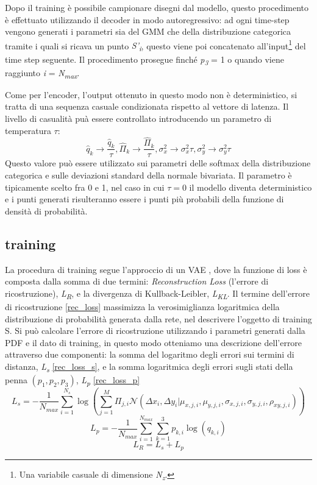 Dopo il training è possibile campionare disegni dal modello, questo procedimento è effettuato utilizzando il decoder in modo autoregressivo: ad ogni time-step vengono generati i parametri sia del GMM che della distribuzione categorica tramite i quali si ricava un punto \textit{S'\textsubscript{i}}, questo viene poi concatenato all'input\footnote{Una variabile casuale di dimensione \textit{N\textsubscript{z}}.} del time step seguente. Il procedimento prosegue finché \textit{p\textsubscript{3}} = 1 o quando viene raggiunto \textit{i} = \textit{N\textsubscript{max}}.

Come per l'encoder, l'output ottenuto in questo modo non è deterministico, si tratta di una sequenza casuale condizionata rispetto al vettore di latenza. Il livello di casualità puà essere controllato introducendo un parametro di temperatura $\tau$:
\begin{equation}
	\label{temperature}
	\hat q_k \rightarrow \frac{\hat q_k}{\tau}, \hat \Pi_k \rightarrow \frac{\hat \Pi_k}{\tau}, \sigma_x^2 \rightarrow \sigma_x^2 \tau, \sigma_y^2 \rightarrow \sigma_y^2 \tau
\end{equation}
Questo valore può essere utilizzato sui parametri delle softmax della distribuzione categorica e sulle deviazioni standard della normale bivariata. Il parametro è tipicamente scelto fra 0 e 1, nel caso in cui $\tau = 0$ il modello diventa deterministico e i punti generati risulteranno essere i punti più probabili della funzione di densità di probabilità.
\subsection{training} %
\label{sub:training}
La procedura di training segue l'approccio di un VAE \cite{VAE}, dove la funzione di loss è composta dalla somma di due termini: \textit{Reconstruction Loss} (l'errore di ricostruzione), \textit{L\textsubscript{R}}, e la divergenza di Kullback-Leibler, \textit{L\textsubscript{KL}}. Il termine dell'errore di ricostruzione \ref{rec_loss} massimizza la verosimiglianza logaritmica della distribuzione di probabilità generata dalla rete, nel descrivere l'oggetto di training S. Si può calcolare l'errore di ricostruzione utilizzando i parametri generati dalla PDF e il dato di training, in questo modo otteniamo una descrizione dell'errore attraverso due componenti: la somma del logaritmo degli errori sui termini di distanza, \textit{L\textsubscript{s}} \ref{rec_loss_s}, e la somma logaritmica degli errori sugli stati della penna $(p_1, p_2, p_3)$, \textit{L\textsubscript{p}} \ref{rec_loss_p}
\begin{equation}
	\label{rec_loss_s}
	L_s = - \frac{1}{N_{max}}\sum_{i=1}^{N_s}\log(\sum_{j=1}^M \Pi_{j,i} \mathcal{N}(\Delta x_i, \Delta y_i | \mu_{x,j, i}, \mu_{y,j, i}, \sigma_{x,j, i}, \sigma_{y,j, i}, \rho_{xy, j, i}))
\end{equation}
\begin{equation}
	\label{rec_loss_p}
	L_p = - \frac{1}{N_{max}}\sum_{i=1}^{N_{max}}\sum_{k=1}^{3} p_{k, i}\log(q_{k, i})
\end{equation}
\begin{equation}
	\label{rec_loss}
	L_R = L_s + L_p
\end{equation}

